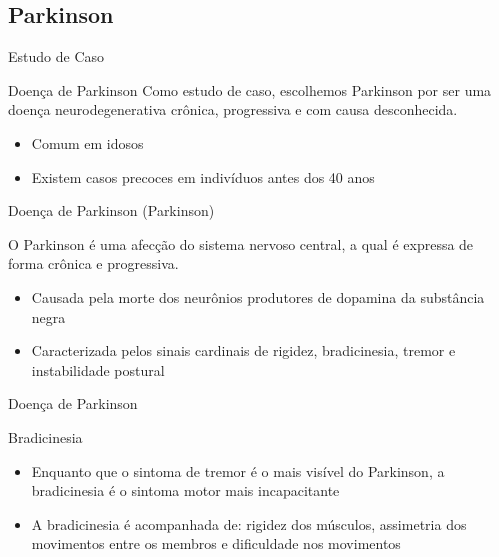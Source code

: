 \documentclass{beamer}
\begin{document}
\subsection{Parkinson}
\begin{frame}{Estudo de Caso}
  \begin{block}{Doença de Parkinson}
   Como estudo de caso, escolhemos Parkinson por ser uma doença neurodegenerativa crônica, progressiva e com causa desconhecida. 
   \begin{itemize}
    \item Comum em idosos
    \item Existem casos precoces em indivíduos antes dos 40 anos
   \end{itemize}
  \end{block}
\end{frame}


\begin{frame}{Doença de Parkinson (Parkinson)}
  \begin{block}{}
    O Parkinson é uma afecção do sistema nervoso central, a qual é expressa de forma crônica e progressiva. 
      \begin{itemize}
       \item Causada pela morte dos neurônios produtores de dopamina da substância negra ~\cite{protpar010}
       \item Caracterizada pelos sinais cardinais de rigidez, bradicinesia, tremor e instabilidade postural ~\cite{jankovic2008}
      \end{itemize}
  \end{block}
\end{frame}


\begin{frame}{Doença de Parkinson}
  \begin{block}{Bradicinesia}
      \begin{itemize}
	\item Enquanto que o sintoma de tremor é o mais visível do Parkinson, a bradicinesia é o sintoma motor mais incapacitante
	\item A bradicinesia é acompanhada de: rigidez dos músculos, assimetria dos movimentos entre os membros e dificuldade nos movimentos
	\end{itemize}
  \end{block}
\end{frame}
  
\end{document}
